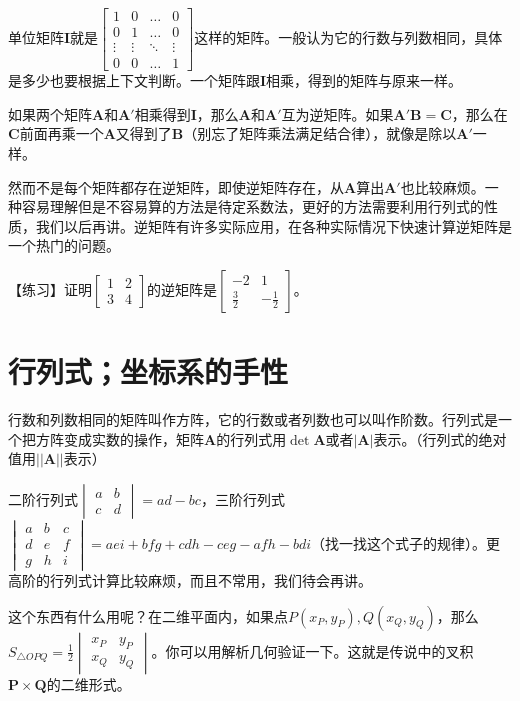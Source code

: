 单位矩阵$\mathbf{I}$就是$\begin{bmatrix}
1 & 0 & \dots & 0 \\
0 & 1 & \dots & 0 \\
\vdots & \vdots & \ddots & \vdots \\
0 & 0 & \dots & 1
\end{bmatrix}$这样的矩阵。一般认为它的行数与列数相同，具体是多少也要根据上下文判断。一个矩阵跟$\mathbf{I}$相乘，得到的矩阵与原来一样。

如果两个矩阵$\mathbf{A}$和$\mathbf{A'}$相乘得到$\mathbf{I}$，那么$\mathbf{A}$和$\mathbf{A'}$互为逆矩阵。如果$\mathbf{A'} \mathbf{B}=\mathbf{C}$，那么在$\mathbf{C}$前面再乘一个$\mathbf{A}$又得到了$\mathbf{B}$（别忘了矩阵乘法满足结合律），就像是除以$\mathbf{A'}$一样。

然而不是每个矩阵都存在逆矩阵，即使逆矩阵存在，从$\mathbf{A}$算出$\mathbf{A'}$也比较麻烦。一种容易理解但是不容易算的方法是待定系数法，更好的方法需要利用行列式的性质，我们以后再讲。逆矩阵有许多实际应用，在各种实际情况下快速计算逆矩阵是一个热门的问题。

【练习】证明$\begin{bmatrix}
1 & 2 \\
3 & 4
\end{bmatrix}$的逆矩阵是$\begin{bmatrix}
-2 & 1 \\
\frac{3}{2} & -\frac{1}{2}
\end{bmatrix}$。
\section{行列式；坐标系的手性}
行数和列数相同的矩阵叫作方阵，它的行数或者列数也可以叫作阶数。行列式是一个把方阵变成实数的操作，矩阵$\mathbf{A}$的行列式用$\det \mathbf{A}$或者$|\mathbf{A}|$表示。（行列式的绝对值用$||\mathbf{A}||$表示）

二阶行列式$\begin{vmatrix}
a & b \\
c & d
\end{vmatrix}=a d-b c$，三阶行列式$\begin{vmatrix}
a & b & c \\
d & e & f \\
g & h & i
\end{vmatrix}=a e i+b f g+c d h-c e g-a f h-b d i$（找一找这个式子的规律）。更高阶的行列式计算比较麻烦，而且不常用，我们待会再讲。

这个东西有什么用呢？在二维平面内，如果点$P(x_P, y_P), Q(x_Q, y_Q)$，那么$S_{\triangle O P Q}=\frac{1}{2}\begin{vmatrix}
x_P & y_P \\
x_Q & y_Q
\end{vmatrix}$。你可以用解析几何验证一下。这就是传说中的叉积$\mathbf{P} \times \mathbf{Q}$的二维形式。


